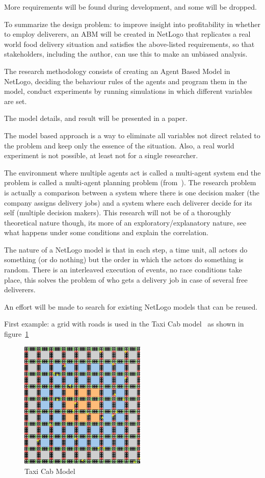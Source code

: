 More requirements will be found during development, and some will be dropped.

To summarize the design problem: to improve insight into profitability in whether to employ deliverers,
an ABM will be created in NetLogo that replicates a real world food delivery situation and satisfies the above-listed requirements,
so that stakeholders, including the author, can use this to make an unbiased analysis.




The research methodology consists of creating an Agent Based Model in NetLogo, deciding the behaviour rules of the agents and program them in the model, conduct
experiments by running simulations in which different variables are set.

The model details, and result will be presented in a paper.

The model based approach is a way to eliminate all variables not direct related to the problem and keep only the essence of the situation.
Also, a real world experiment is not possible, at least not for a single researcher.

The environment where multiple agents act is called a multi-agent system end the problem is called a multi-agent planning problem (from~\cite{russell2016artificial}).
The research problem is actually a comparison between a system where there is one decision maker (the company assigns delivery jobs) and a system where each deliverer decide for its self (multiple decision makers).
This research will not be of a thoroughly theoretical nature though, its more of an exploratory/explanatory nature, see what happens under some conditions and explain the correlation.

The nature of a NetLogo model is that in each step, a time unit, all actors do something (or do nothing) but the order in which the actors do something is random.
There is an interleaved execution of events, no race conditions take place, this solves the problem of who gets a delivery job in case of several free deliverers.

An effort will be made to search for existing NetLogo models that can be reused.

First example: a grid with roads is used in the Taxi Cab model~\cite{dongpingtaxicabs2019} as shown in figure~\ref{fig:taxi cab}
\begin{figure}
    \centering
    \includegraphics[width=6cm]{sections/pics/Taxi Cabs}
    \caption{Taxi Cab Model}
    \label{fig:taxi cab}
\end{figure}

